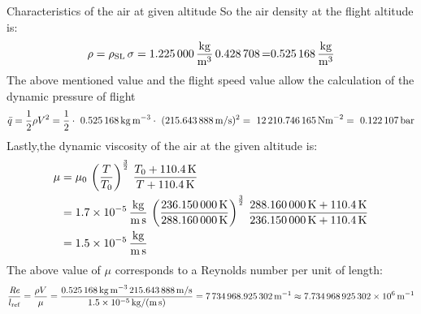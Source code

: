\documentclass[[12pt,twoside]{book}
\begin{document}
\begin{myExampleX}{Characteristics of the air at given altitude}{}
So the air density at the flight altitude is:
\[
\rho = \rho_\text{SL} \, \sigma 
     = \SI[round-precision=3]{\myDensitysealevel}{\si{\frac{kg}{m^{3}}}} \, \SI[round-precision=3]{\myRelativedensity} 
     = \SI[round-precision=3]{\myDensity}{\si{\frac{kg}{m^{3}}}}
\]
%
The above mentioned value and the flight speed value allow the calculation of the dynamic pressure of flight
\[
\bar{q}=\frac{1}{2} \rho V^{2} =\frac{1}{2}\cdot\ \SI[round-precision=3]{\myDensity}{kg~m^{-3}} \cdot\ (\SI[round-precision=2]{\mySpeedMs}{m/s})^{2} =~\SI[round-precision=2]{\myDynamicpressureNm}{N m^{-2}}=~\SI[round-precision=3]{\myDynamicpressureBar}{bar}
\]
Lastly,the dynamic viscosity of the air at the given  altitude is:
\[
\begin{split}
\mu & {}= \mu_0 \, \left(\frac{T}{T_0}\right)^{\frac{3}{2}} \,                 \frac {T_0 + \SI{110.4}{K}}{T + \SI{110.4}{K}}
    \\
     & {}=\SI[round-precision=1,scientific-notation=true]{\myCone}  {\si {\frac{kg}{m\,s}}}\, \left(\frac{\SI[round-precision=2]{\myTemperatureK}{K}}  {\SI[round-precision=2]{\myTemperaturesealevelK}{K}}
     \right)^{\frac{3}{2}} \,  \frac{\SI[round-precision=2]{\myTemperaturesealevelK}{K} + \SI{110.4}{K}}{\SI[round-precision=2]{\myTemperatureK}{K} + \SI{110.4}{K}}
     \\
     & {}=\SI[round-precision=1,scientific-notation=true]{
     \myDynamicviscosity } {\si {\frac{kg}{m\,s}}}
\end{split}
\]
The above value of $\mu$ corresponds to a Reynolds number per unit of length:
\[
 \frac{\text{\itshape{Re}}}{l_\text{ref}} 
   = \frac{\rho V}{\mu}
   = \frac{
     \SI[round-precision=3]{\myDensity}{kg\,m^{-3}}\,
       \SI[round-precision=2]{\mySpeedMs}{m/s}
       }{
         \SI[round-precision=2,scientific-notation=true]{\myDynamicviscosity}{kg/(m\,s)}
       }
 = \SI[round-precision=0]{\myReynoldsnumeberperunitoflenght}{m^{-1}}
 \approx \SI[scientific-notation=engineering,round-precision=2]{\myReynoldsnumeberperunitoflenght}{m^{-1}}
\]
\end{myExampleX}
\end{document}
